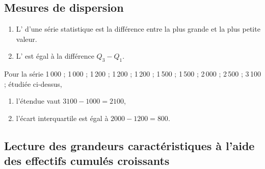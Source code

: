 \subsection{Mesures de dispersion}


\begin{enumerate}
    \item L' d'une série statistique est la différence entre
  la plus grande et la plus petite valeur.
\item L' est égal à la différence $Q_3-Q_1$.
\end{enumerate}


\begin{example}
Pour la série  1\,000 ; 1\,000 ; 1\,200 ; 1\,200 ; 1\,200 ; 1\,500 ; 1\,500 ;
  2\,000 ; 2\,500 ; 3\,100 ; étudiée ci-dessus, 
  \begin{enumerate}
  \item l'étendue vaut \( 3100-1000=2100\),
  \item l'écart interquartile est égal à \( 2000-1200=800\).
  \end{enumerate}
\end{example}

\subsection{Lecture des grandeurs caractéristiques à l'aide des
  effectifs cumulés croissants}

